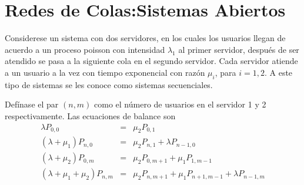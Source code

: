 %
\section{Redes de Colas:Sistemas Abiertos}

Considerese un sistema con dos servidores, en los cuales los usuarios llegan de acuerdo a un proceso poisson con intensidad $\lambda_{1}$ al primer servidor, despu\'es de ser atendido se pasa a la siguiente cola en el segundo servidor. Cada servidor atiende a un usuario a la vez con tiempo exponencial con raz\'on $\mu_{i}$, para $i=1,2$. A este tipo de sistemas se les conoce como sistemas secuenciales.

Def\'inase el par $\left(n,m\right)$ como el n\'umero de usuarios en el servidor 1 y 2 respectivamente. Las ecuaciones de balance son
\begin{eqnarray}\label{Eq.Balance}
\lambda P_{0,0}&=&\mu_{2}P_{0,1}\\
\left(\lambda+\mu_{1}\right)P_{n,0}&=&\mu_{2}P_{n,1}+\lambda P_{n-1,0}\\
\left(\lambda+\mu_{2}\right)P_{0,m}&=&\mu_{2}P_{0,m+1}+\mu_{1}P_{1,m-1}\\
\left(\lambda+\mu_{1}+\mu_{2}\right)P_{n,m}&=&\mu_{2}P_{n,m+1}+\mu_{1}P_{n+1,m-1}+\lambda
P_{n-1,m}
\end{eqnarray}

